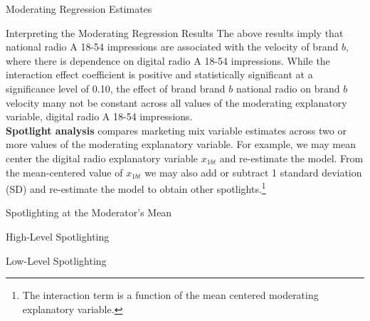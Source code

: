 \documentclass[pdf]{beamer}
\newcommand{\empr}[1]{{\color{franklinblue}\textbf{#1}}}
\theoremstyle{remark}
\theoremstyle{definition}
\begin{document}
\begin{frame}[t]{Moderating Regression Estimates}
\footnotesize

\end{frame}

\begin{frame}[t]{Interpreting the Moderating Regression Results}
The above results imply that national radio A 18-54 impressions are associated with the velocity of  brand $b$, where there is dependence on digital radio A 18-54 impressions. While the interaction effect coefficient is positive and statistically significant at a significance level of 0.10, the effect of brand brand $b$ national radio on brand $b$ velocity many not be constant across all values of the moderating explanatory variable, digital radio A 18-54 impressions. \\
\vspace{1.5ex}
\empr{Spotlight analysis} compares marketing mix variable estimates across two or more values of the moderating explanatory variable.  For example, we may mean center the digital radio explanatory variable $x_{1bt}$ and re-estimate the model.  From the mean-centered value of $x_{1bt}$ we may also add or subtract 1 standard deviation (SD) and re-estimate the model to obtain other spotlights.\footnote{The interaction term is a function of the mean centered moderating explanatory variable.} 
\end{frame}

\begin{frame}[t]{Spotlighting at the Moderator's Mean}
\footnotesize

\end{frame}

\begin{frame}[t]{High-Level Spotlighting}
\footnotesize

\end{frame}

\begin{frame}[t]{Low-Level Spotlighting}
\footnotesize

\end{frame}
\end{document}
